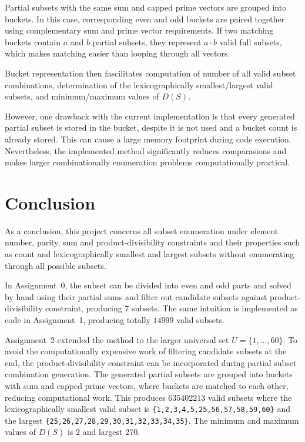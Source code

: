 \documentclass[11pt,a4paper]{article}
\begin{document}
Partial subsets with the same sum and capped prime vectors are grouped into buckets. In this case, corresponding even and odd buckets are paired together using complementary sum and prime vector requirements. If two matching buckets contain $a$ and $b$ partial subsets, they represent $a\cdot b$ valid full subsets, which makes matching easier than looping through all vectors.

Bucket representation then fascilitates computation of number of all valid subset combinations, determination of the lexicographically smallest/largest valid subsets, and minimum/maximum values of $D(S)$.

However, one drawback with the current implementation is that every generated partial subset is stored in the bucket, despite it is not used and a bucket count is already stored. This can cause a large memory footprint during code execution. Nevertheless, the implemented method significantly reduces comparasions and makes larger combinationally enumeration problems computationally practical.

\section*{Conclusion}

As a conclusion, this project concerns all subset enumeration under element number, parity, sum and product-divisibility constraints and their properties such as count and lexicographically smallest and largest subsets without enumerating through all possible subsets.

In Assignment~0, the subset can be divided into even and odd parts and solved by hand using their partial sums and filter out candidate subsets against product-divisibility constraint, producing 7 subsets. The same intuition is implemented as code in Assignment~1, producing totally $14999$ valid subsets.

Assignment~2 extended the method to the larger universal set
$U=\{1,\ldots,60\}$. To avoid the computationally expensive work of filtering candidate subsets at the end, the product-divisibility constraint can be incorporated during partial subset combination generation. The generated partial subsets are grouped into buckets with sum and capped prime vectors, where buckets are matched to each other, reducing computational work. This produces $635402213$ valid subsets where the lexicographically smallest valid subset is \texttt{\{1,2,3,4,5,25,56,57,58,59,60\}} and the largest \texttt{\{25,26,27,28,29,30,31,32,33,34,35\}}. The minimum and maximum values of $D(S)$ is $2$ and largest $270$.
\end{document}
